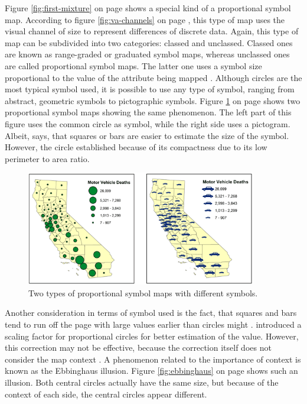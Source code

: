 
Figure \ref{fig:first-mixture} on page \pageref{fig:first-mixture} shows a special kind of a proportional symbol map. According to figure \ref{fig:va-channels} on page \pageref{fig:va-channels}, this type of map uses the visual channel of size to represent differences of discrete data. Again, this type of map can be subdivided into two categories: classed and unclassed. Classed ones are known as range-graded or graduated symbol maps, whereas unclassed ones are called proportional symbol maps. The latter one uses a symbol size proportional to the value of the attribute being mapped .
Although circles are the most typical symbol used, it is possible to use any type of symbol, ranging from abstract, geometric symbols to pictographic symbols. Figure \ref{fig:different-symbols} on page \pageref{fig:different-symbols} shows two proportional symbol maps showing the same phenomenon. The left part of this figure uses the common circle as symbol, while the right side uses a pictogram. Albeit, \citeauthor{Dutton.2014} says, that squares or bars are easier to estimate the size of the symbol. However, the circle established because of its compactness due to its low perimeter to area ratio.

\begin{figure}[!htb]
\centering
\includegraphics[height=5cm,keepaspectratio]{images/psm/symbols.png}
\caption[
    Two types of proportional symbol maps with different symbols .
]{Two types of proportional symbol maps with different symbols.}
\label{fig:different-symbols}
\end{figure}

Another consideration in terms of symbol used is the fact, that squares and bars tend to run off the page with large values earlier than circles might . \citeauthor{FLANNERY1971} introduced a scaling factor for proportional circles for better estimation of the value. However, this correction may not be effective, because the correction itself does not consider the map context . A phenomenon related to the importance of context is known as the Ebbinghaus illusion. Figure \ref{fig:ebbinghaus} on page \pageref{fig:ebbinghaus} shows such an illusion. Both central circles actually have the same size, but because of the context of each side, the central circles appear different.

